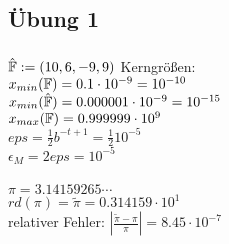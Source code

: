 \subsection{Übung 1}
\subsubsection{}
$ \hat{\mathbb{F}} := (10,6,-9,9) $
Kerngrößen:\\
$ x_{min}(\mathbb{F}) = 0.1 \cdot 10^{-9} = 10^{-10} $ \\
$ x_{min}(\hat{\mathbb{F}}) = 0.000001 \cdot 10^{-9} = 10^{-15} $ \\
$ x_{max}(\mathbb{F}) = 0.999999 \cdot 10^{9} $ \\
$ eps = \frac{1}{2} b^{-t + 1} = \frac{1}{2} 10^{-5} $ \\
$ \epsilon_{M} = 2eps = 10^{-5} $ \\
\\
$ \pi = 3.14159265\cdots $ \\
$ rd(\pi) = \tilde{\pi} = 0.314159 \cdot 10^1 $ \\
relativer Fehler: $ | \frac{\tilde{\pi} - \pi}{\pi} | = 8.45 \cdot 10^{-7} $
